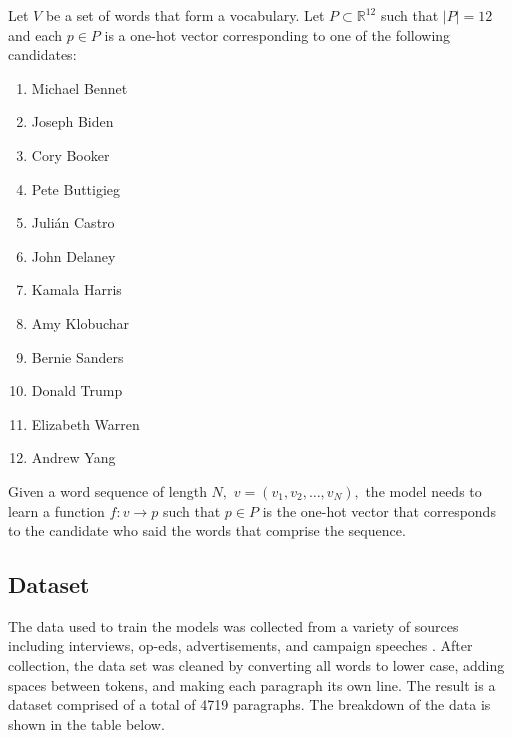 \documentclass{article}
\begin{document}
Let $V$ be a set of words that form a vocabulary. Let $P \subset \mathbb{R}^{12}$ such that $|P| = 12$ and each $p \in P$ is a one-hot vector corresponding to one of the following candidates:
\begin{multicols}{3}
    \begin{enumerate}
        \item Michael Bennet
        \item Joseph Biden
        \item Cory Booker
        \item Pete Buttigieg
        \item Julián Castro
        \item John Delaney
        \item Kamala Harris
        \item Amy Klobuchar
        \item Bernie Sanders
        \item Donald Trump
        \item Elizabeth Warren
        \item Andrew Yang
    \end{enumerate}
\end{multicols}
Given a word sequence of length $N,$ $v = (v_1, v_2, \dots, v_N),$ the model needs to learn a function $f:v \to p$ such that $p \in P$ is the one-hot vector that corresponds to the candidate who said the words that comprise the sequence.

\subsection{Dataset}
The data used to train the models was collected from a variety of sources including interviews, op-eds, advertisements, and campaign speeches \cite{githubdataset}. After collection, the data set was cleaned by converting all words to lower case, adding spaces between tokens, and making each paragraph its own line. The result is a dataset comprised of a total of 4719 paragraphs. The breakdown of the data is shown in the table below.
\end{document}
